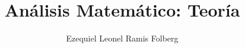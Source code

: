 


    \title{Análisis Matemático: Teoría}
    \author{Ezequiel Leonel Ramis Folberg}
    \maketitle
    \tableofcontents
    \newpage
    \setcounter{section}{-1}
    
    
